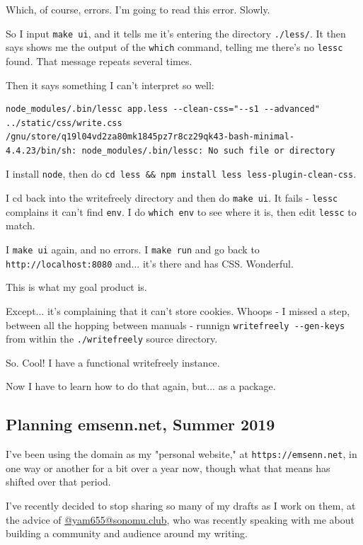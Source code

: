 \documentclass[11pt]{article}
\begin{document}
Which, of course, errors. I'm going to read this error. Slowly.

So I input \texttt{make ui}, and it tells me it's entering the directory
\texttt{./less/}. It then says shows me the output of the \texttt{which} command,
telling me there's no \texttt{lessc} found. That message repeats several
times.

Then it says something I can't interpret so well:

\begin{verbatim}
node_modules/.bin/lessc app.less --clean-css="--s1 --advanced" ../static/css/write.css
/gnu/store/q19l04vd2za80mk1845pz7r8cz29qk43-bash-minimal-4.4.23/bin/sh: node_modules/.bin/lessc: No such file or directory
\end{verbatim}

I install \texttt{node}, then do \texttt{cd less \&\& npm install less
less-plugin-clean-css}.

I cd back into the writefreely directory and then do \texttt{make ui}. It
fails - \texttt{lessc} complains it can't find \texttt{env}. I do \texttt{which env} to see
where it is, then edit \texttt{lessc} to match.

I \texttt{make ui} again, and no errors. I \texttt{make run} and go back to
\texttt{http://localhost:8080} and... it's there and has CSS. Wonderful.

This is what my goal product is.

Except... it's complaining that it can't store cookies. Whoops - I
missed a step, between all the hopping between manuals - runnign
\texttt{writefreely -{}-gen-keys} from within the \texttt{./writefreely} source
directory.

So. Cool! I have a functional writefreely instance.

Now I have to learn how to do that again, but... as a package.
\subsection*{Planning emsenn.net, Summer 2019}
\label{sec:org8a96ea7}
I've been using the domain as my "personal website," at
\texttt{https://emsenn.net}, in one way or another for a bit over a year now,
though what that means has shifted over that period.

I've recently decided to stop sharing so many of my drafts as I work
on them, at the advice of \href{https://sonomu.club/@yam655}{@yam655@sonomu.club}, who was recently
speaking with me about building a community and audience around my
writing.
\end{document}
